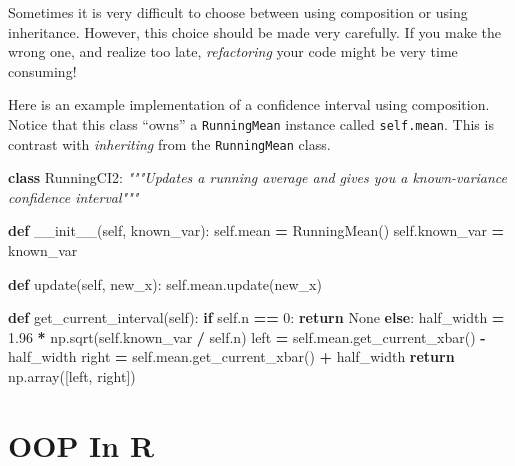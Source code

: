 \documentclass[12pt,krantz2]{krantz}
\makeatletter
\newenvironment{Shaded}{\begin{snugshade}}{\end{snugshade}}
\newcommand{\CommentTok}[1]{\textcolor[rgb]{0.37,0.37,0.37}{\textit{#1}}}
\newcommand{\ControlFlowTok}[1]{\textcolor[rgb]{0.27,0.27,0.27}{\textbf{#1}}}
\newcommand{\DecValTok}[1]{\textcolor[rgb]{0.06,0.06,0.06}{#1}}
\newcommand{\FloatTok}[1]{\textcolor[rgb]{0.06,0.06,0.06}{#1}}
\newcommand{\FunctionTok}[1]{\textcolor[rgb]{0,0,0}{#1}}
\newcommand{\KeywordTok}[1]{\textcolor[rgb]{0.27,0.27,0.27}{\textbf{#1}}}
\newcommand{\NormalTok}[1]{#1}
\newcommand{\OperatorTok}[1]{\textcolor[rgb]{0.43,0.43,0.43}{\textbf{#1}}}
\newcommand{\VariableTok}[1]{\textcolor[rgb]{0,0,0}{#1}}
\newenvironment{kframe}{%
\medskip{}
\setlength{\fboxsep}{.8em}
 \def\at@end@of@kframe{}%
 \ifinner\ifhmode%
  \def\at@end@of@kframe{\end{minipage}}%
  \begin{minipage}{\columnwidth}%
 \fi\fi%
 \def\FrameCommand##1{\hskip\@totalleftmargin \hskip-\fboxsep
 \colorbox{shadecolor}{##1}\hskip-\fboxsep
     \hskip-\linewidth \hskip-\@totalleftmargin \hskip\columnwidth}%
 \MakeFramed {\advance\hsize-\width
   \@totalleftmargin\z@ \linewidth\hsize
   \@setminipage}}%
 {\par\unskip\endMakeFramed%
 \at@end@of@kframe}
\renewenvironment{Shaded}{\begin{kframe}}{\end{kframe}}
\makeatother
\begin{document}
\begin{rmd-caution}
Sometimes it is very difficult to choose between using composition or using inheritance. However, this choice should be made very carefully. If you make the wrong one, and realize too late, \emph{refactoring} your code might be very time consuming!

\end{rmd-caution}

Here is an example implementation of a confidence interval using composition. Notice that this class ``owns'' a \texttt{RunningMean} instance called \texttt{self.mean}. This is contrast with \emph{inheriting} from the \texttt{RunningMean} class.

\begin{Shaded}
\begin{Highlighting}[]
\KeywordTok{class}\NormalTok{ RunningCI2:}
    \CommentTok{"""Updates a running average and }
\CommentTok{    gives you a known-variance confidence interval"""}
    
    \KeywordTok{def} \FunctionTok{__init__}\NormalTok{(}\VariableTok{self}\NormalTok{, known_var):}
        \VariableTok{self}\NormalTok{.mean }\OperatorTok{=}\NormalTok{ RunningMean()}
        \VariableTok{self}\NormalTok{.known_var }\OperatorTok{=}\NormalTok{ known_var}
        
    \KeywordTok{def}\NormalTok{ update(}\VariableTok{self}\NormalTok{, new_x):    }
        \VariableTok{self}\NormalTok{.mean.update(new_x)}
        
    \KeywordTok{def}\NormalTok{ get_current_interval(}\VariableTok{self}\NormalTok{):}
        \ControlFlowTok{if} \VariableTok{self}\NormalTok{.n }\OperatorTok{==} \DecValTok{0}\NormalTok{:}
            \ControlFlowTok{return} \VariableTok{None}
        \ControlFlowTok{else}\NormalTok{:}
\NormalTok{            half_width }\OperatorTok{=} \FloatTok{1.96} \OperatorTok{*}\NormalTok{ np.sqrt(}\VariableTok{self}\NormalTok{.known_var }\OperatorTok{/} \VariableTok{self}\NormalTok{.n)  }
\NormalTok{            left }\OperatorTok{=} \VariableTok{self}\NormalTok{.mean.get_current_xbar() }\OperatorTok{-}\NormalTok{ half_width}
\NormalTok{            right }\OperatorTok{=} \VariableTok{self}\NormalTok{.mean.get_current_xbar() }\OperatorTok{+}\NormalTok{ half_width}
            \ControlFlowTok{return}\NormalTok{ np.array([left, right])}
\end{Highlighting}
\end{Shaded}

\hypertarget{oop-in-r}{%
\section{OOP In R}\label{oop-in-r}}
\end{document}
